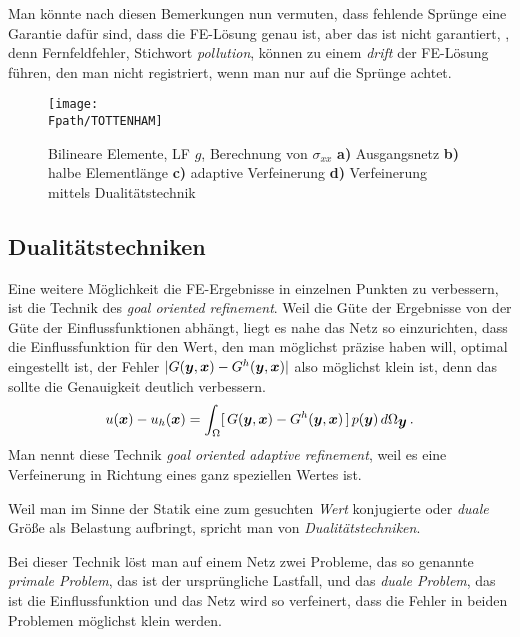 {{\begin{remark}
Man k\"{o}nnte nach diesen Bemerkungen nun vermuten, dass fehlende Spr\"{u}nge eine Garantie daf\"{u}r sind, dass die FE-L\"{o}sung \glq genau\grq{} ist, aber das ist nicht garantiert, \cite{Ha5}, denn Fernfeldfehler, Stichwort {\em pollution\/}, k\"{o}nnen zu einem {\em drift\/} der FE-L\"{o}sung f\"{u}hren, den man nicht registriert, wenn man nur auf die Spr\"{u}nge achtet.
\end{remark}
\begin{figure}[tbp] \centering
\if {} \sidecaption \fi
\texttt{[image: \\Fpath/TOTTENHAM]}
\caption{Bilineare Elemente, LF $g$, Berechnung von $\sigma_{xx}$ {\bf a)} Ausgangsnetz
{\bf b)} halbe Elementl\"{a}nge {\bf c)} adaptive Verfeinerung {\bf d)} Verfeinerung mittels
Dualit\"{a}tstechnik}\label{Tottenham}
\end{figure}

{\textcolor{sectionTitleBlue}{\subsection{Dualit\"{a}tstechniken}}}
Eine weitere M\"{o}glichkeit die FE-Ergebnisse in einzelnen Punkten zu verbessern, ist die Technik des {\em goal oriented refinement\/}.
Weil die G\"{u}te der Ergebnisse von der G\"{u}te der Ein\-fluss\-funktionen abh\"{a}ngt, liegt es nahe das Netz so einzurichten,  dass die Einflussfunktion f\"{u}r den Wert, den man m\"{o}glichst pr\"{a}zise haben will, optimal eingestellt ist, der Fehler $|G(\mbox{\boldmath $y$},\mbox{\boldmath $x$}) - G^h(\mbox{\boldmath $y$},\mbox{\boldmath $x$})|$ also m\"{o}glichst klein ist, denn das sollte die Genauigkeit deutlich verbessern.
\begin{align}\label{Fehler1B14}
u(\mbox{\boldmath $x$}) - u_h(\mbox{\boldmath $x$}) = \int_{\Omega}[\, G(\mbox{\boldmath $y$},\mbox{\boldmath $x$}) - G^h(\mbox{\boldmath $y$},\mbox{\boldmath $x$})\,]\,p(\mbox{\boldmath $y$})\,d\Omega_{\mbox{\boldmath $y$}}\,.
\end{align}
Man nennt diese Technik {\em goal oriented adaptive refinement\/}, weil es eine Verfeinerung in Richtung eines ganz speziellen Wertes ist.

Weil man im Sinne der Statik eine zum gesuchten {\em Wert\/} konjugierte oder {\em duale\/} Gr\"{o}{\ss}e als Belastung aufbringt, spricht man von {\em Dualit\"{a}tstechniken\/}.

Bei dieser Technik l\"{o}st man auf einem Netz zwei Probleme, das so genannte {\em primale Problem\/}, das ist der urspr\"{u}ngliche Lastfall, und das {\em duale Problem\/}, das ist die Einflussfunktion und das Netz wird so verfeinert, dass die Fehler in beiden Problemen m\"{o}glichst klein werden.

}}
